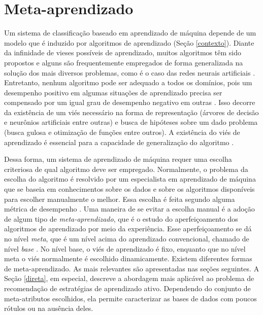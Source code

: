 \newpage
\section{Meta-aprendizado} \label{meta}
Um sistema de classificação baseado em aprendizado de máquina depende
de um modelo que é induzido por algoritmos de aprendizado (Seção \ref{contexto}).
Diante da infinidade de vieses possíveis de aprendizado,
muitos algoritmos têm sido propostos e alguns são frequentemente
empregados de forma generalizada na solução dos mais diversos problemas,
como é o caso das redes neurais artificiais \citep{haykin2004comprehensive}.
Entretanto, nenhum algoritmo pode ser adequado a todos os domínios,
pois um desempenho positivo em algumas situações de aprendizado
precisa ser compensado por um igual grau de desempenho negativo
em outras \citep{conf/icml/Schaffer94}.
Isso decorre da existência de um viés necessário na forma de representação
(árvores de decisão e neurônios artificiais entre outras)
e busca de hipóteses sobre um dado problema (busca gulosa e otimização de funções entre outros).
A existência do viés de aprendizado é essencial para a capacidade de generalização
do algoritmo \citep{Mitchell:1980}.

Dessa forma, um sistema de aprendizado de máquina requer
uma escolha criteriosa de qual algoritmo deve ser empregado.
Normalmente, o problema da escolha do algoritmo é resolvido
por um especialista em aprendizado de máquina que se baseia em conhecimentos
sobre os dados e sobre os algoritmos disponíveis
para escolher manualmente o melhor.
Essa escolha é feita segundo alguma métrica de desempenho
\cite{books/daglib/0022052}.
Uma maneira de se evitar a escolha manual é a adoção de algum tipo
de \textit{meta-aprendizado}, que é o estudo do aperfeiçoamento dos
algoritmos de aprendizado por meio da experiência.
Esse aperfeiçoamento se dá no nível \textit{meta},
que é um nível acima do aprendizado convencional, chamado de nível \textit{base}
\citep{journals/air/VilaltaD02}.
No nível base, o viés de aprendizado é fixo, enquanto que
no nível meta o viés normalmente é escolhido dinamicamente.
Existem diferentes formas de meta-aprendizado.
As mais relevantes são apresentadas nas seções seguintes.
A Seção \ref{direta}, em especial, descreve a abordagem mais aplicável ao problema de
recomendação de estratégias de aprendizado ativo.
Dependendo do conjunto de meta-atributos escolhidos,
ela permite caracterizar as bases de dados com poucos rótulos ou na ausência deles.

